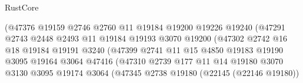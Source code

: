 \begin{lexlean}{RustCore}
\begin{coremodule}
                                      (@47376
                                        @19159
                                        @2746
                                        @2760
                                        @11
                                        @19184
                                        @19200
                                        @19226
                                        @19240
                                        (@47291
                                          @2743
                                          @2448
                                          @2493
                                          @11
                                          @19184
                                          @19193
                                          @3070
                                          @19200
                                          (@47302
                                            @2742
                                            @16
                                            @18
                                            @19184
                                            @19191
                                            @3240
                                            (@47399
                                              @2741
                                              @11
                                              @15
                                              @4850
                                              @19183
                                              @19190
                                              @3095
                                              @19164
                                              @3064
                                              @47416
                                              (@47310
                                                @2739
                                                @177
                                                @11
                                                @14
                                                @19180
                                                @3070
                                                @3130
                                                @3095
                                                @19174
                                                @3064
                                                (@47345
                                                  @2738
                                                  @19180
                                                  (@22145 (@22146 @19180))

\end{coremodule}
\end{lexlean}

